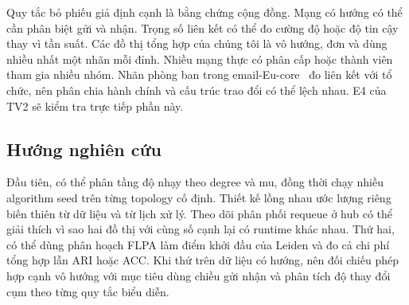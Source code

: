 Quy tắc bỏ phiếu giả định cạnh là bằng chứng cộng đồng. Mạng có hướng có thể cần phân biệt gửi và nhận. Trọng số liên kết có thể đo cường độ hoặc độ tin cậy thay vì tần suất. Các đồ thị tổng hợp của chúng tôi là vô hướng, đơn và dùng nhiều nhất một nhãn mỗi đỉnh. Nhiều mạng thực có phân cấp hoặc thành viên tham gia nhiều nhóm. Nhãn phòng ban trong email-Eu-core~\cite{snap,yin} đo liên kết với tổ chức, nên phân chia hành chính và cấu trúc trao đổi có thể lệch nhau. E4 của TV2 sẽ kiểm tra trực tiếp phần này.

\subsection{Hướng nghiên cứu}
Đầu tiên, có thể phân tầng độ nhạy theo degree và mu, đồng thời chạy nhiều algorithm seed trên từng topology cố định. Thiết kế lồng nhau ước lượng riêng biến thiên từ dữ liệu và từ lịch xử lý. Theo dõi phân phối requeue ở hub có thể giải thích vì sao hai đồ thị với cùng số cạnh lại có runtime khác nhau. Thứ hai, có thể dùng phân hoạch FLPA làm điểm khởi đầu của Leiden và đo cả chi phí tổng hợp lẫn ARI hoặc ACC. Khi thử trên dữ liệu có hướng, nên đối chiếu phép hợp cạnh vô hướng với mục tiêu dùng chiều gửi nhận và phân tích độ thay đổi cụm theo từng quy tắc biểu diễn.
